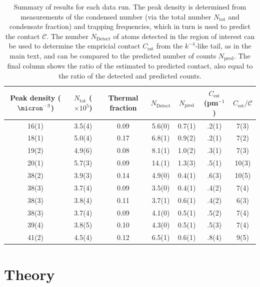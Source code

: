 \begin{table}
	\begin{tabular}{c c c c c c c}
	\hline\hline
	Peak density ($\micron^{-3}$) & $N_\textrm{tot}$ ($\times10^5$) & Thermal fraction & $N_\textrm{Detect}$ & $N_\textrm{pred}$ & $C_\textrm{est}$ (pm$^{-1}$)  &$C_\textrm{est}/\mathcal{C}$  \\ 
	\hline 
	16(1) & 3.5(4) & 0.09 & 5.6(0) & 0.7(1) & .2(1)& 7(3) \\ 
	18(1) & 5.0(4) & 0.17 & 6.8(1) & 0.9(2) & .2(1)& 7(2) \\ 
	19(2) & 4.9(6) & 0.08 & 8.1(1) & 1.0(2) & .3(1)& 7(3) \\ 
	20(1) & 5.7(3) & 0.09 & 14.(1) & 1.3(3) & .5(1)& 10(3) \\ 
	38(2) & 3.9(3) & 0.14 & 4.9(0) & 0.4(1) & .6(3)& 10(5) \\ 
	38(3) & 3.7(4) & 0.09 & 3.5(0) & 0.4(1) & .4(2)& 7(4) \\ 
	38(3) & 3.8(4) & 0.11 & 3.7(1) & 0.6(1) & .4(2)& 6(3) \\ 
	38(3) & 3.7(4) & 0.09 & 4.1(0) & 0.5(1) & .5(2)& 7(4) \\ 
	39(4) & 3.8(5) & 0.10 & 4.3(0) & 0.5(1) & .5(3)& 7(4) \\ 
	41(2) & 4.5(4) & 0.12 & 6.5(1) & 0.6(1) & .8(4)& 9(5) \\ 
	\hline\hline
	\end{tabular}
	\caption{Summary of results for each data run. The peak density is determined from measurements of the condensed number (via the total number $N_\textrm{tot}$ and condensate fraction) and trapping frequencies, which in turn is used to predict the contact $\mathcal{C}$. The number $N_\textrm{Detect}$ of atoms detected in the region of interest can be used to determine the empricial contact $C_\textrm{est}$ from the $k^{-4}$-like tail, as in the main text, and can be compared to the predicted number of counts $N_\textrm{pred}$. The final column shows the ratio of the estimated to predicted contact, also equal to the ratio of the detected and predicted counts.}
	\label{tab:results}
\end{table}

\section{Theory}

